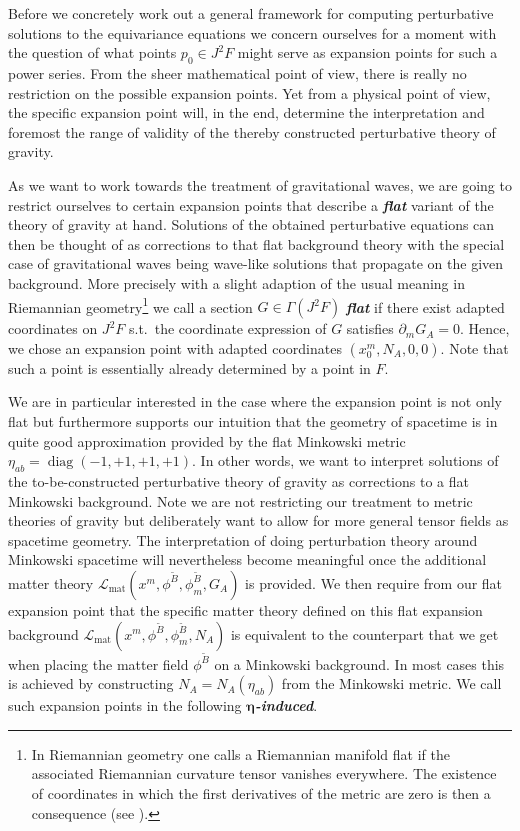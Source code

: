 Before we concretely work out a general framework for computing perturbative solutions to the equivariance equations we concern ourselves for a moment with the question of what points $p_0 \in J^2F$ might serve as expansion points for such a power series. From the sheer mathematical point of view, there is really no restriction on the possible expansion points. Yet from a physical point of view, the specific expansion point will, in the end, determine the interpretation and foremost the range of validity of the thereby constructed perturbative theory of gravity. 

As we want to work towards the treatment of gravitational waves, we are going to restrict ourselves to certain expansion points that describe a \textit{\textbf{flat}} variant of the theory of gravity at hand. Solutions of the obtained perturbative equations can then be thought of as corrections to that flat background theory with the special case of gravitational waves being wave-like solutions that propagate on the given background. More precisely with a slight adaption of the usual meaning in Riemannian geometry\footnote{In Riemannian geometry one calls a Riemannian manifold flat if the associated Riemannian curvature tensor vanishes everywhere. The existence of coordinates in which the first derivatives of the metric are zero is then a consequence (see \cite{petersen2006riemannian}).} we call a section $G \in \Gamma(J^2F)$ \textit{\textbf{flat}} if there exist adapted coordinates on $J^2F$ s.t.\ the coordinate expression of $G$ satisfies $\partial_mG_{A}=0$.
Hence, we chose an expansion point with adapted coordinates $(x_0^m,N_A,0,0)$. Note that such a point is essentially already determined by a point in $F$. 

We are in particular interested in the case where the expansion point is not only flat but furthermore supports our intuition that the geometry of spacetime is in quite good approximation provided by the flat Minkowski metric $\eta_{ab} = \operatorname{diag}(-1,+1,+1,+1)$. 
%
%
In other words, we want to interpret solutions of the to-be-constructed perturbative theory of gravity as corrections to a flat Minkowski background. Note we are not restricting our treatment to metric theories of gravity but deliberately want to allow for more general tensor fields as spacetime geometry.
The interpretation of doing perturbation theory around Minkowski spacetime will nevertheless become meaningful once the additional matter theory $\mathcal{L}_{\text{mat}}(x^m,\phi^{\tilde{B}},\phi^{\tilde{B}}_m,G_A)$ is provided. We then require from our flat expansion point that the specific matter theory defined on this flat expansion background $\mathcal{L}_{\text{mat}}(x^m,\phi^{\tilde{B}},\phi^{\tilde{B}}_m,N_A)$ is equivalent to the counterpart that we get when placing the matter field $\phi^{\tilde{B}}$ on a Minkowski background. 
In most cases this is achieved by constructing $N_A = N_A(\eta_{ab})$ from the Minkowski metric. We call such expansion points in the following \textit{\textbf{$\boldsymbol{\eta}$-induced}}.

